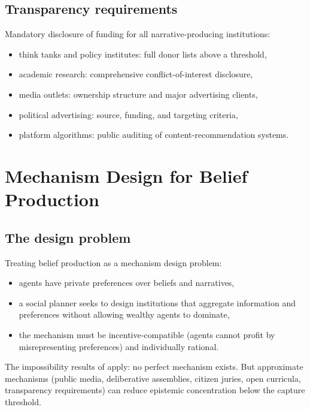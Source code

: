 \subsection{Transparency requirements}

Mandatory disclosure of funding for all narrative-producing institutions:
\begin{itemize}[nosep]
  \item think tanks and policy institutes: full donor lists above a threshold,
  \item academic research: comprehensive conflict-of-interest disclosure,
  \item media outlets: ownership structure and major advertising clients,
  \item political advertising: source, funding, and targeting criteria,
  \item platform algorithms: public auditing of content-recommendation systems.
\end{itemize}

\section{Mechanism Design for Belief Production}
\label{sec:ch32-mechanism}

\subsection{The design problem}

\begin{model}
\label{mod:democratic-belief}
Treating belief production as a mechanism design problem:
\begin{itemize}[nosep]
  \item agents have private preferences over beliefs and narratives,
  \item a social planner seeks to design institutions that aggregate information and preferences without allowing wealthy agents to dominate,
  \item the mechanism must be incentive-compatible (agents cannot profit by misrepresenting preferences) and individually rational.
\end{itemize}
The impossibility results of \textcite{arrow1963} apply: no perfect mechanism exists.
But approximate mechanisms (public media, deliberative assemblies, citizen juries, open curricula, transparency requirements) can reduce epistemic concentration below the capture threshold.
\end{model}


